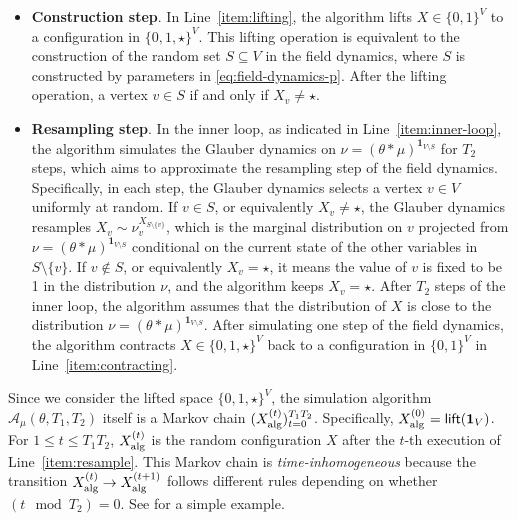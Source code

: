 \documentclass[11pt,a4paper]{article}
\theoremstyle{definition}
\def\*#1{\mathbf{#1}} %
\def\+#1{\mathcal{#1}} %
\begin{document}
\begin{itemize}
    \item \textbf{Construction step}. In Line~\ref{item:lifting}, the algorithm lifts $X \in \{0,1\}^V$ to a configuration in $\{0,1,\star\}^V$.
    This lifting operation is equivalent to the construction of the random set $S \subseteq V$ in the field dynamics, where $S$ is constructed by parameters in \eqref{eq:field-dynamics-p}.
    After the lifting operation, a vertex $v \in S$ if and only if $X_v \neq \star$. 
    \item \textbf{Resampling step}. In the inner loop, as indicated in Line~\ref{item:inner-loop}, the algorithm simulates the Glauber dynamics on $\nu = (\theta * \mu)^{\*1_{V \setminus S}}$ for $T_2$ steps, which aims to approximate the resampling step of the field dynamics.
    Specifically, in each step, the Glauber dynamics selects a vertex $v \in V$ uniformly at random.
    If $v \in S$, or equivalently $X_v \neq \star$, the Glauber dynamics resamples $X_v \sim \nu_v^{X_{S \setminus \{v\}}}$, which is the marginal distribution on $v$ projected from $\nu = (\theta * \mu)^{\*1_{V \setminus S}}$ conditional on the current state of the other variables in $S \setminus \{v\}$. 
    If $v \notin S$, or equivalently $X_v = \star$, it means the value of $v$ is fixed to be 1 in the distribution $\nu$, and the algorithm keeps $X_v = \star$.
    After $T_2$ steps of the inner loop, the algorithm assumes that the distribution of $X$ is close to the distribution $\nu=(\theta * \mu)^{\*1_{V \setminus S}}$.
    After simulating one step of the field dynamics, the algorithm contracts $X \in \{0,1,\star\}^V$ back to a configuration in $\{0,1\}^V$ in Line~\ref{item:contracting}.
\end{itemize}





Since we consider the lifted space $\{0,1,\star\}^V$,
the simulation algorithm $\+A_{\mu}(\theta,T_1,T_2)$ itself is a Markov chain $(X^{(t)}_{\textnormal{alg}})_{t=0}^{T_1T_2}$. Specifically, $X^{(0)}_{\textnormal{alg}} = \textsf{lift}(\*1_V)$.
For $1 \leq t \leq T_1T_2$, $X^{(t)}_{\textnormal{alg}}$ is the random configuration $X$ after the $t$-th execution of Line~\ref{item:resample}. %
This Markov chain is \emph{time-inhomogeneous} because the transition $X^{(t)}_{\textnormal{alg}} \to X^{(t+1)}_{\textnormal{alg}}$ follows different rules depending on whether $(t \mod T_2) = 0$.
See  for a simple example.
\end{document}

